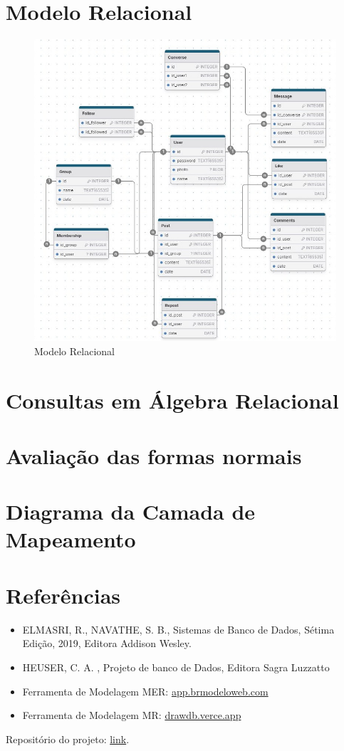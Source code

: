 \documentclass{article}
\begin{document}
\section{Modelo Relacional}

\begin{figure}[!ht]
        \centering
        \includegraphics[width=1\textwidth]{imagens/mr.jpg}
        \caption{Modelo Relacional}
\end{figure}

\section{Consultas em Álgebra Relacional}

\section{Avaliação das formas normais}

\section{Diagrama da Camada de Mapeamento}

\section{Referências}
\begin{itemize}
        \item ELMASRI, R., NAVATHE, S. B., Sistemas de Banco de Dados, Sétima Edição, 2019, Editora Addison Wesley.
        \item HEUSER, C. A. , Projeto de banco de Dados, Editora Sagra Luzzatto
        \item Ferramenta de Modelagem MER: \href{https://app.brmodeloweb.com/#!/conceptual/66dd8939bb821248818df271}{app.brmodeloweb.com}
        \item Ferramenta de Modelagem MR: \href{https://drawdb.vercel.app/}{drawdb.verce.app}
\end{itemize}

Repositório do projeto: \href{https://github.com/qrno/BD-2024-1}{link}.
\end{document}
